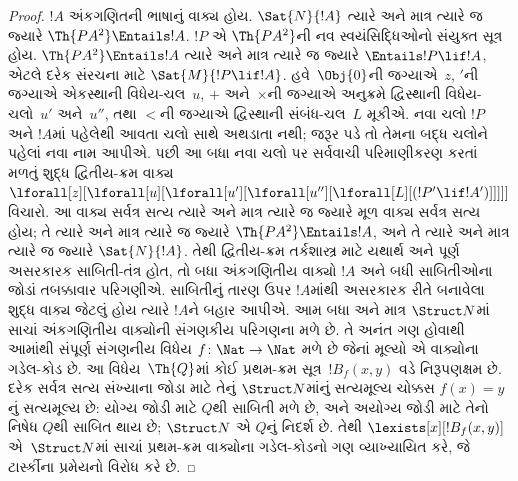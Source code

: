 \begin{proof}
$!A$ અંકગણિતની ભાષાનું વાક્ય હોય. $\Sat{N}{!A}$ ત્યારે
અને માત્ર ત્યારે જ જ્યારે $\Th{PA^2} \Entails !A$. $!P$ એ
$\Th{PA^2}$ની નવ સ્વયંસિદ્ધિઓનો સંયુક્ત સૂત્ર હોય. $\Th{PA^2} \Entails !A$
ત્યારે અને માત્ર ત્યારે જ જ્યારે $\Entails !P \lif
!A$, એટલે દરેક સંરચના માટે
$\Sat{M}{!P \lif !A}$. 
હવે~$\Obj{0}$ની જગ્યાએ~$z$, $\prime$ની જગ્યાએ એકસ્થાની
વિધેય-ચલ~$u$, $+$ અને~$\times$ની જગ્યાએ અનુક્રમે દ્વિસ્થાની
વિધેય-ચલો~$u'$ અને~$u''$, તથા $<$ની જગ્યાએ દ્વિસ્થાની સંબંધ-ચલ~$L$
મૂકીએ. નવા ચલો $!P$ અને $!A$માં પહેલેથી આવતા ચલો સાથે અથડાતા
નથી; જરૂર પડે તો તેમના બદ્ધ ચલોને પહેલાં નવા નામ આપીએ.
પછી આ બધા નવા ચલો પર સર્વવાચી પરિમાણીકરણ કરતાં મળતું શુદ્ધ
દ્વિતીય-ક્રમ વાક્ય
$\lforall[z][\lforall[u][\lforall[u'][\lforall[u''][\lforall[L][(!P' \lif !A')]]]]]$
વિચારો. આ વાક્ય સર્વત્ર સત્ય ત્યારે અને માત્ર ત્યારે જ જ્યારે મૂળ વાક્ય
સર્વત્ર સત્ય હોય; તે ત્યારે અને માત્ર ત્યારે જ જ્યારે
$\Th{PA^2} \Entails !A$, અને તે ત્યારે અને માત્ર ત્યારે જ જ્યારે
$\Sat{N}{!A}$. તેથી દ્વિતીય-ક્રમ તર્કશાસ્ત્ર માટે યથાર્થ અને પૂર્ણ
અસરકારક સાબિતી-તંત્ર હોત, તો બધા અંકગણિતીય વાક્યો $!A$ અને
બધી સાબિતીઓના જોડાં તબક્કાવાર પરિગણીએ. સાબિતીનું તારણ ઉપર
$!A$માંથી અસરકારક રીતે બનાવેલા શુદ્ધ વાક્ય જેટલું હોય ત્યારે
$!A$ને બહાર આપીએ. આમ બધા અને માત્ર $\Struct N$માં સાચાં
અંકગણિતીય વાક્યોની સંગણકીય પરિગણના મળે છે. તે અનંત ગણ હોવાથી
આમાંથી સંપૂર્ણ સંગણનીય વિધેય
$f\colon\Nat\to\Nat$ મળે છે જેનાં મૂલ્યો એ વાક્યોના ગડેલ-કોડ છે.
આ વિધેય~$\Th{Q}$માં કોઈ પ્રથમ-ક્રમ સૂત્ર~$!B_f(x,y)$ વડે
નિરૂપણક્ષમ છે. દરેક સર્વત્ર સત્ય સંખ્યાના જોડા માટે તેનું
$\Struct N$માંનું સત્યમૂલ્ય ચોક્કસ $f(x)=y$નું સત્યમૂલ્ય છે:
યોગ્ય જોડી માટે $Q$થી સાબિતી મળે છે, અને અયોગ્ય જોડી માટે
તેનો નિષેધ $Q$થી સાબિત થાય છે; $\Struct N$ એ $Q$નું નિદર્શ છે.
તેથી $\lexists[x][!B_f(x,y)]$ એ~$\Struct N$માં સાચાં પ્રથમ-ક્રમ
વાક્યોના ગડેલ-કોડનો ગણ વ્યાખ્યાયિત કરે, જે ટાર્સ્કીના પ્રમેયનો
વિરોધ કરે છે.
\end{proof}
\endgroup


